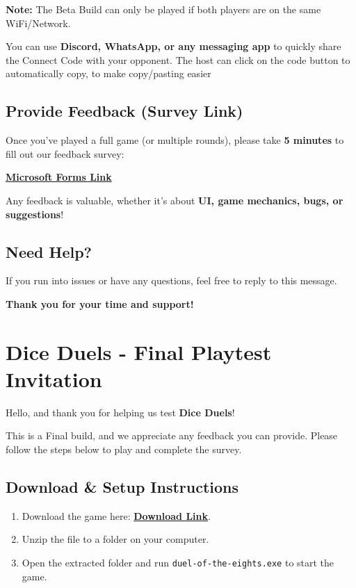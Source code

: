 \documentclass{article}
\begin{document}
\textbf{Note:} The Beta Build can only be played if both players are on the same WiFi/Network.

\begin{tcolorbox}[colback=gray!10, colframe=black, title=Tip]
You can use \textbf{Discord, WhatsApp, or any messaging app} to quickly share the Connect Code with your opponent.
The host can click on the code button to automatically copy, to make copy/pasting easier
\end{tcolorbox}

\subsection{Provide Feedback (Survey Link)}

Once you’ve played a full game (or multiple rounds), please take \textbf{5 minutes} to fill out our feedback survey:

\href{https://forms.office.com/r/nYjE7qfsYG}{\textbf{Microsoft Forms Link}}

Any feedback is valuable, whether it's about \textbf{UI, game mechanics, bugs, or suggestions}!

\subsection{Need Help?}
If you run into issues or have any questions, feel free to reply to this message.

\bigskip

\begin{center}
\textbf{Thank you for your time and support!}
\end{center}


\newpage

\section{Dice Duels - Final Playtest Invitation}

Hello, and thank you for helping us test \textbf{Dice Duels}!

This is a Final build, and we appreciate any feedback you can provide. Please follow the steps below to play and complete the survey.

\subsection{Download \& Setup Instructions}
\begin{enumerate}
    \item Download the game here: \href{https://drive.google.com/file/d/1d3nVYBTYOlCqEDQzMCE7T-mupDVaDM37/view?usp=sharing}{\textbf{Download Link}}.
    \item Unzip the file to a folder on your computer.
    \item Open the extracted folder and run \texttt{duel-of-the-eights.exe} to start the game.
\end{enumerate}
\end{document}
